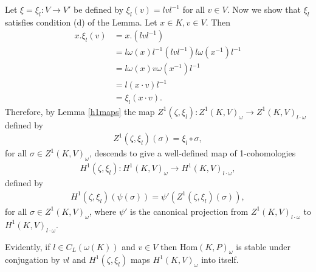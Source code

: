 Let $\xi = \xi_l: V \rightarrow V'$ be defined by	$\xi_l(v) = lvl^{-1}$ for all $v \in V$. Now we show that $\xi_l$ satisfies condition (d) of the Lemma. Let $x \in K, v \in V$. Then
	\begin{align*}
		x . \xi_l(v) &= x . \left(lvl^{-1}\right) \\
		&= l\omega(x)l^{-1} \left(lvl^{-1}\right) l\omega(x^{-1})l^{-1} \\
		&= l\omega(x)v\omega(x^{-1})l^{-1} \\
		&= l\left(x \cdot v \right)l^{-1} \\
		&= \xi_l \left(x \cdot v \right).
	\end{align*}
	Therefore, by Lemma \ref{h1maps} the map $Z^1(\zeta, \xi_l):Z^1(K, V)_\omega \rightarrow Z^1(K, V)_{l \cdot \omega}$ defined by 
	\begin{align*}
		Z^1(\zeta, \xi_l)(\sigma) = \xi_l \circ \sigma,
	\end{align*}
	for all $\sigma \in Z^1(K, V)_\omega$,
	descends to give a well-defined map of 1-cohomologies
	\begin{align*}
		H^1(\zeta, \xi_l):H^1(K, V)_\omega \rightarrow H^1(K, V)_{l \cdot \omega},
	\end{align*}
	defined by
	\begin{align*}
		H^1(\zeta, \xi_l)\left(\psi(\sigma)\right) = \psi'\left(Z^1(\zeta, \xi_l)(\sigma)\right),
	\end{align*}
	for all $\sigma \in Z^1(K, V)_\omega$,
	where $\psi'$ is the canonical projection from $Z^1(K, V)_{l \cdot \omega}$ to $H^1(K, V)_{l \cdot \omega}$.

	Evidently, if $l \in C_L\left(\omega(K)\right)$ and $v\in V$ then $\mathrm{Hom}(K, P)_\omega$ is stable under conjugation by $vl$ and $H^1(\zeta, \xi_l)$ maps $H^1(K, V)_{\omega}$ into itself.

